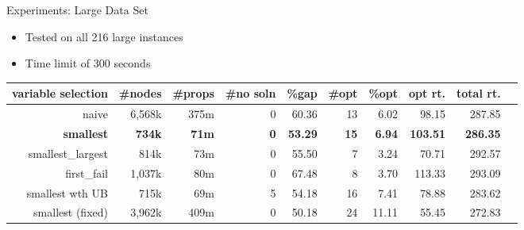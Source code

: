 \documentclass{beamer}
\begin{document}
\begin{frame}{Experiments: Large Data Set}
	\begin{itemize}
		\item Tested on all 216 large instances
		\item Time limit of 300 seconds \pause
	\end{itemize}
	\begin{table}[H]
		\begin{adjustwidth}{-.9in}{-.9in}
		\centering
		\scriptsize
		\begin{tabular}{r|rrrrrrrrr}
			\hline
			variable selection & \#nodes & \#props & \#no soln & \%gap & \#opt & \%opt & opt rt. & total rt.   \\
			\hline
			naive & 6,568k & 375m & 0 & 60.36 & 13 & 6.02 & 98.15 & 287.85 \\
			\bf{smallest} & \bf{734k} & \bf{71m} & \bf{0} & \bf{53.29} & \bf{15} & \bf{6.94} & \bf{103.51} & \bf{286.35} \\
			smallest\_largest & 814k & 73m & 0 & 55.50 & 7 & 3.24 & 70.71 & 292.57 \\
			first\_fail & 1,037k & 80m & 0 & 67.48 & 8 & 3.70 & 113.33 & 293.09 \\\pause
			smallest wth UB & 715k & 69m & 5 & 54.18 & 16 & 7.41 & 78.88 & 283.62 \\\pause
			smallest (fixed) & 3,962k & 409m & 0 & 50.18 & 24 & 11.11 & 55.45 & 272.83 \\\hline
		\end{tabular}
		\end{adjustwidth}
	\end{table}
\end{frame}
\end{document}
